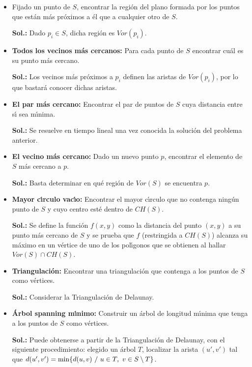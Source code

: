 \documentclass[twoside]{report}
\begin{document}
\begin{itemize}

  \item Fijado un punto de $S$, encontrar la regi\'{o}n del plano formada por los puntos que est\'{a}n m\'{a}s pr\'{o}ximos a \'{e}l que a cualquier otro de $S$.

  \item[\textbf{Sol.:}] Dado $p_i \in S$, dicha regi\'{o}n es $Vor(p_i)$.


  \item \textbf{Todos los vecinos m\'{a}s cercanos:} Para cada punto de $S$ encontrar cu\'{a}l es su punto m\'{a}s cercano.

  \item[\textbf{Sol.:}] Los vecinos m\'{a}s pr\'{o}ximos a $p_i$ definen las aristas de $Vor(p_i)$, por lo que bastar\'{a} conocer dichas aristas.


  \item \textbf{El par m\'{a}s cercano:} Encontrar el par de puntos de $S$ cuya distancia entre s\'{\i} sea m\'{\i}nima.

  \item[\textbf{Sol.:}] Se resuelve en tiempo lineal una vez conocida la soluci\'{o}n del
problema anterior.


  \item \textbf{El vecino m\'{a}s cercano:} Dado un nuevo punto $p$,
encontrar el elemento de $S$ m\'{a}s cercano a $p$.

  \item[\textbf{Sol.:}] Basta determinar en qu\'{e} regi\'{o}n de $Vor(S)$ se encuentra $p$.


  \item \textbf{Mayor c\'{\i}rculo vac\'{\i}o:} Encontrar el mayor c\'{\i}rculo que no contenga ning\'{u}n punto de $S$ y cuyo centro est\'{e} dentro de $CH(S)$.

  \item[\textbf{Sol.:}] Se define la funci\'{o}n $f(x,y)$ como la distancia del punto $(x,y)$ a su punto m\'{a}s cercano de $S$ y se prueba que $f$ (restringida a $CH(S)$) alcanza su m\'{a}ximo en un v\'{e}rtice de uno de los pol\'{\i}gonos que se obtienen al hallar $Vor(S)\cap CH(S)$.


  \item \textbf{Triangulaci\'{o}n:} Encontrar una triangulaci\'{o}n que contenga a los puntos de $S$ como v\'{e}rtices.

  \item[\textbf{Sol.:}] Considerar la Triangulaci\'on de Delaunay.


  \item \textbf{\'{A}rbol spanning m\'{\i}nimo:} Construir un \'{a}rbol de longitud m\'{\i}nima que tenga a los puntos de $S$ como v\'{e}rtices.

  \item[\textbf{Sol.:}] Puede obtenerse a partir de la Triangulaci\'on de Delaunay, con el siguiente procedimiento: elegido un árbol $T$, localizar la arista $(u',v')$ tal que $d(u',v')={\rm min}\{d(u,v) \ / \ u\in T, \ v\in S\setminus T\}$.

\end{itemize}
\end{document}

